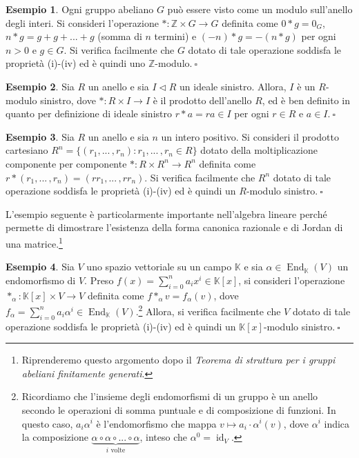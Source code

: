 \documentclass{article}
\theoremstyle{definition}
\newtheorem*{exm}{Esempio}
\begin{document}
\begin{exm}Ogni gruppo abeliano $G$ può essere visto come un modulo sull'anello degli interi. Si consideri l'operazione $\ast\colon \mathbb{Z}\times G\to G$ definita come $0\ast g=0_G$, $n\ast g=g+g+...+g$ (somma di $n$ termini) e $(-n)\ast g=-(n\ast g)$ per ogni $n>0$ e $g\in G$. Si verifica facilmente che $G$ dotato di tale operazione soddisfa le proprietà (i)-(iv) ed è quindi uno $\mathbb{Z}$-modulo$. \ \square$\end{exm} 

\begin{exm}Sia $R$ un anello e sia $I\lhd R$ un ideale sinistro. Allora, $I$ è un $R$-modulo sinistro, dove $\ast\colon R \times I\to I$ è il prodotto dell'anello $R$, ed è ben definito in quanto per definizione di ideale sinistro $r\ast a=ra\in I$ per ogni $r\in R$ e $a\in I. \ \square$\end{exm}

\begin{exm}Sia $R$ un anello e sia $n$ un intero positivo. Si consideri il prodotto cartesiano $R^n=\{(r_1,...\,,r_n): r_1,...\,,r_n\in R\}$ dotato della moltiplicazione componente per componente $\ast\colon R\times R^n\to R^n$ definita come $r\ast (r_1,...\,,r_n)=(rr_1,...\,,rr_n)$. Si verifica facilmente che $R^n$ dotato di tale operazione soddisfa le proprietà (i)-(iv) ed è quindi un $R$-modulo sinistro$. \ \square$\end{exm}

\noindent L'esempio seguente è particolarmente importante nell'algebra lineare perché permette di dimostrare l'esistenza della forma canonica razionale e di Jordan di una matrice.\footnote{Riprenderemo questo argomento dopo il \emph{Teorema di struttura per i gruppi abeliani finitamente generati}.}

\begin{exm}Sia $V$ uno spazio vettoriale su un campo $\mathbb{K}$ e sia $\alpha\in \operatorname{End}_{\mathbb{K}}(V)$ un endomorfismo di $V$. Preso $f(x)=\sum\limits_{i=0}^n a_i x^i \in \mathbb{K}[x]$, si consideri l'operazione $\ast_{\alpha}\colon \mathbb{K}[x]\times V\to V$ definita come $f\ast_{\alpha} v =f_{\alpha}(v)$, dove $f_{\alpha}=\sum\limits_{i=0}^n a_i \alpha^i \in \operatorname{End}_{\mathbb{K}}(V)$.\footnote{Ricordiamo che l'insieme degli endomorfismi di un gruppo è un anello secondo le operazioni di somma puntuale e di composizione di funzioni. In questo caso, $a_i \alpha^i$ è l'endomorfismo che mappa $v\mapsto a_i\cdot \alpha^i(v)$, dove $\alpha^i$ indica la composizione $\underbrace{\alpha\circ \alpha\circ ... \circ \alpha}_{i \text{ volte}}$, inteso che $\alpha^0=\operatorname{id}_{V}$.} Allora, si verifica facilmente che $V$ dotato di tale operazione soddisfa le proprietà (i)-(iv) ed è quindi un $\mathbb{K}[x]$-modulo sinistro$. \ \square$\end{exm}
\end{document}
